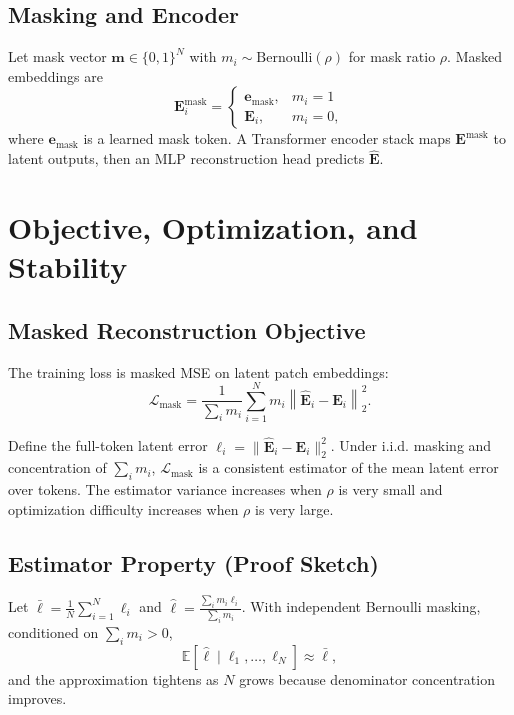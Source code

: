 \documentclass[conference]{IEEEtran}
\begin{document}
\subsection{Masking and Encoder}
Let mask vector $\mathbf{m} \in \{0,1\}^{N}$ with $m_i \sim \mathrm{Bernoulli}(\rho)$ for mask ratio $\rho$. Masked embeddings are
\begin{equation}
\mathbf{E}^{\text{mask}}_i =
\begin{cases}
\mathbf{e}_{\text{mask}}, & m_i = 1 \\
\mathbf{E}_i, & m_i = 0,
\end{cases}
\label{eq:masking}
\end{equation}
where $\mathbf{e}_{\text{mask}}$ is a learned mask token. A Transformer encoder stack maps $\mathbf{E}^{\text{mask}}$ to latent outputs, then an MLP reconstruction head predicts $\hat{\mathbf{E}}$.

\section{Objective, Optimization, and Stability}
\subsection{Masked Reconstruction Objective}
The training loss is masked MSE on latent patch embeddings:
\begin{equation}
\mathcal{L}_{\text{mask}} = \frac{1}{\sum_i m_i} \sum_{i=1}^{N} m_i \left\|\hat{\mathbf{E}}_i - \mathbf{E}_i\right\|_2^2.
\label{eq:loss}
\end{equation}

Define the full-token latent error $\ell_i = \|\hat{\mathbf{E}}_i - \mathbf{E}_i\|_2^2$. Under i.i.d. masking and concentration of $\sum_i m_i$, $\mathcal{L}_{\text{mask}}$ is a consistent estimator of the mean latent error over tokens. The estimator variance increases when $\rho$ is very small and optimization difficulty increases when $\rho$ is very large.

\subsection{Estimator Property (Proof Sketch)}
Let $\bar{\ell}=\frac{1}{N}\sum_{i=1}^{N}\ell_i$ and $\hat{\ell}=\frac{\sum_i m_i\ell_i}{\sum_i m_i}$. With independent Bernoulli masking, conditioned on $\sum_i m_i > 0$,
\begin{equation}
\mathbb{E}[\hat{\ell}\mid \ell_1,\ldots,\ell_N] \approx \bar{\ell},
\label{eq:consistency}
\end{equation}
and the approximation tightens as $N$ grows because denominator concentration improves.
\end{document}
